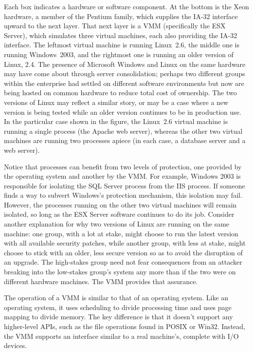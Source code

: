 Each box indicates a hardware or software component.
At the bottom is the Xeon hardware, a member of the Pentium family,
which supplies the IA-32
interface upward to the next layer.  That next layer is a VMM
(specifically the ESX Server), which simulates three virtual machines,
each also providing the IA-32 interface.  The leftmost virtual machine
is running Linux~2.6, the middle one is running Windows~2003, and the
rightmost one is running an older version of Linux, 2.4.  The presence
of Microsoft Windows and Linux on the same hardware may have come
about through server consolidation; perhaps two different groups
within the enterprise had settled on different software environments
but now are being hosted on common hardware to reduce total cost of
ownership.  The two versions of Linux may reflect a similar story, or
may be a case where a new version is being tested while an older
version continues to be in production use.  In the particular case
shown in the figure, the Linux~2.6 virtual machine is running a single
process (the Apache web server), whereas the other two virtual
machines are running two processes apiece (in each case, a database
server and a web server).

Notice that processes can benefit from two levels of
protection, one provided by the operating system and another by the
VMM.  For example, Windows 2003 is responsible for isolating the SQL
Server process from the IIS process.  If someone finds a way to
subvert Windows's protection mechanism, this isolation may fail.
However, the processes running on the other two virtual machines will
remain isolated, so long as the ESX Server software continues to do
its job.  Consider another explanation for why two versions of
Linux are running on the same machine: one group, with a lot at stake,
might choose to run the latest version with all available security
patches, while another group, with less at stake, might choose to
stick with an older, less secure version so as to avoid the disruption
of an upgrade.  The high-stakes group need not fear consequences from
an attacker breaking into the low-stakes group's system any more than
if the two were on different hardware machines.  The VMM provides that
assurance.

The operation of a VMM is similar to that of an operating system.
Like an operating system, it uses scheduling to divide processing time
and uses page mapping to divide memory.  The key difference is that it
doesn't support any higher-level APIs, such as the file operations
found in POSIX or Win32. Instead, the VMM supports an
interface similar to a real machine's, complete with I/O devices.

